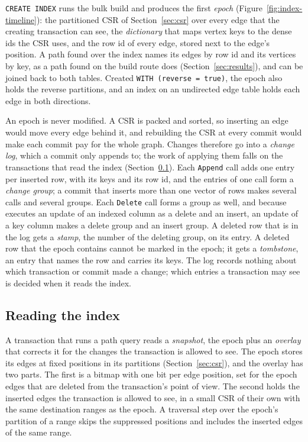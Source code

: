 \texttt{CREATE INDEX} runs the bulk build and produces the first \emph{epoch} (Figure~\ref{fig:index-timeline}): the
partitioned CSR of Section~\ref{sec:csr} over every edge that the creating transaction can see, the \emph{dictionary}
that maps vertex keys to the dense ids the CSR uses, and the row id of every edge, stored next to the edge's position.
A path found over the index names its edges by row id and its vertices by key, as a path found on the build
route does (Section~\ref{sec:results}), and can be joined back to both tables.
Created \texttt{WITH (reverse = true)}, the epoch also holds the reverse partitions, and an index on an undirected edge
table holds each edge in both directions.

An epoch is never modified. A CSR is packed and sorted, so inserting an edge would move every edge behind it, and
rebuilding the CSR at every commit would make each commit pay for the whole graph. Changes therefore go into a
\emph{change log}, which a commit only appends to; the work of applying them falls on the transactions that read the
index (Section~\ref{sec:index-read}). Each \texttt{Append} call adds one entry per inserted row, with its keys and
its row id, and the entries of one call form a \emph{change group}; a commit that inserts more than one vector of rows
makes several calls and several groups. Each \texttt{Delete} call forms a group as well, and because \duckdb
executes an update of an indexed column as a delete and an insert, an update of a key column makes a delete group and
an insert group. A deleted row that
is in the log gets a \emph{stamp}, the number of the deleting group, on its entry. A deleted row that the epoch
contains cannot be marked in the epoch; it gets a \emph{tombstone}, an entry that names the row and carries its
keys. The log records nothing about which transaction or commit made a change; which entries a transaction may see is
decided when it reads the index.

\subsection{Reading the index}
\label{sec:index-read}

A transaction that runs a path query reads a \emph{snapshot}, the epoch plus an \emph{overlay} that corrects it for
the changes the transaction is allowed to see. The epoch stores its edges at fixed positions in its partitions
(Section~\ref{sec:csr}), and the overlay has two parts. The first is a bitmap with one bit per edge position, set
for the epoch edges that are deleted from the transaction's point of view. The second holds the inserted edges the
transaction is allowed to see, in a small CSR of their own with the same destination ranges as the epoch. A traversal step over the epoch's partition of a range skips the suppressed positions and includes the inserted
edges of the same range.

